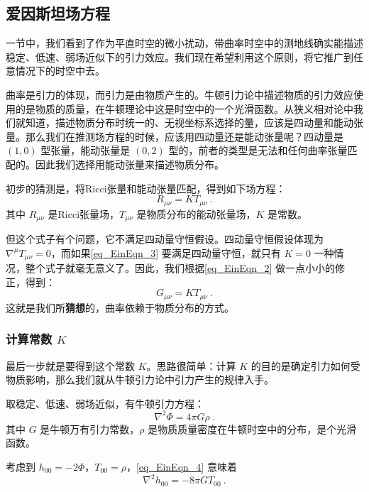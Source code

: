\subsection{爱因斯坦场方程}

一节中，我们看到了作为平直时空的微小扰动，带曲率时空中的测地线确实能描述稳定、低速、弱场近似下的引力效应。我们现在希望利用这个原则，将它推广到任意情况下的时空中去。

曲率是引力的体现，而引力是由物质产生的。牛顿引力论中描述物质的引力效应使用的是物质的质量，在牛顿理论中这是时空中的一个光滑函数。从狭义相对论中我们就知道，描述物质分布时统一的、无视坐标系选择的量，应该是四动量和能动张量。那么我们在推测场方程的时候，应该用四动量还是能动张量呢？四动量是 $(1, 0)$ 型张量，能动张量是 $(0, 2)$ 型的，前者的类型是无法和任何曲率张量匹配的。因此我们选择用能动张量来描述物质分布。

初步的猜测是，将Ricci张量和能动张量匹配，得到如下场方程：
\begin{equation}\label{eq_EinEqn_3}
R_{\mu\nu}=KT_{\mu\nu}~.
\end{equation}
其中 $R_{\mu\nu}$ 是Ricci张量场，$T_{\mu\nu}$ 是物质分布的能动张量场，$K$ 是常数。

但这个式子有个问题，它不满足四动量守恒假设。四动量守恒假设体现为 $\nabla^\mu T_{\mu\nu}=0$，而如果\autoref{eq_EinEqn_3} 要满足四动量守恒，就只有 $K=0$ 一种情况，整个式子就毫无意义了。因此，我们根据\autoref{eq_EinEqn_2} 做一点小小的修正，得到：
\begin{equation}
G_{\mu\nu}=KT_{\mu\nu}~.
\end{equation}
这就是我们所\textbf{猜想}的，曲率依赖于物质分布的方式。



\subsubsection{计算常数 $K$}


最后一步就是要得到这个常数 $K$。思路很简单：计算 $K$ 的目的是确定引力如何受物质影响，那么我们就从牛顿引力论中引力产生的规律入手。

取稳定、低速、弱场近似，有牛顿引力方程：
\begin{equation}\label{eq_EinEqn_4}
\nabla^2\Phi=4\pi G\rho~.
\end{equation}
其中 $G$ 是牛顿万有引力常数，$\rho$ 是物质质量密度在牛顿时空中的分布，是个光滑函数。

考虑到 $h_{00}=-2\Phi$，$T_{00}=\rho$，\autoref{eq_EinEqn_4} 意味着
\begin{equation}\label{eq_EinEqn_7}
\nabla^2h_{00}=-8\pi G T_{00}~.
\end{equation}



